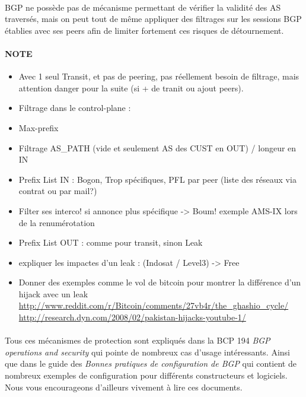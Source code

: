 \paragraph{}
BGP ne possède pas de mécanisme permettant de vérifier la validité des AS traversés, mais on peut tout de même appliquer des filtrages sur les sessions BGP établies avec ses peers afin de limiter fortement ces risques de détournement.

\paragraph{NOTE}
\begin{itemize}
\item Avec 1 seul Transit, et pas de peering, pas réellement besoin de filtrage, mais attention danger pour la suite (si + de tranit ou ajout peers).
\item Filtrage dans le control-plane : 
\item Max-prefix
\item Filtrage AS\_PATH (vide et seulement AS des CUST en OUT) / longeur en IN
\item Prefix List IN  : Bogon, Trop spécifiques, PFL par peer (liste des réseaux via contrat ou par mail?)
\item Filter ses interco! si annonce plus spécifique -> Boum! exemple AMS-IX lors de la renumérotation
\item Prefix List OUT : comme pour transit, sinon Leak
\item expliquer les impactes d'un leak :  (Indosat / Level3) -> Free
\item Donner des exemples comme le vol de bitcoin pour montrer la différence d'un hijack avec un leak
\url{http://www.reddit.com/r/Bitcoin/comments/27vb4r/the_ghashio_cycle/}
\url{http://research.dyn.com/2008/02/pakistan-hijacks-youtube-1/}
\end{itemize}

\paragraph{}
Tous ces mécanismes de protection sont expliqués dans la BCP 194 \emph{BGP operations and security} \cite{fenioux:BGPOPSEC} qui pointe de nombreux cas d'usage intéressants. Ainsi que dans le guide des \emph{Bonnes pratiques de configuration de BGP} \cite{fenioux:ANSSIBGP} qui contient de nombreux exemples de configuration pour différents constructeurs et logiciels. Nous vous encourageons d'ailleurs vivement à lire ces documents.

